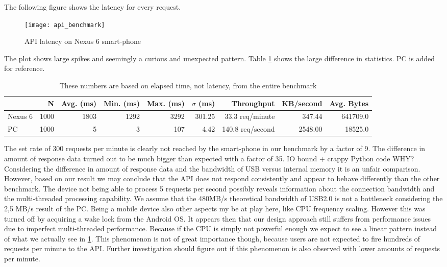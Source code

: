 The following figure shows the latency for every request.
\begin{figure}[h]
	\centering
	\texttt{[image: api\_benchmark]}
	\caption{API latency on Nexus 6 smart-phone}
	\label{fig:api_benchmark}
\end{figure}
The plot shows large spikes and seemingly a curious and unexpected pattern.
Table \ref{table:api_benchmark} shows the large difference in statistics.
PC is added for reference.
\begin{table}
  \begin{tabular}{l | *{8}{r}} \hline
  	 & N & Avg. (ms) & Min. (ms) & Max. (ms) & $\sigma$ (ms) & Throughput & KB/second & Avg. Bytes \\ \hline \hline
	Nexus 6 & 1000 & 1803 & 1292 & 3292 & 301.25 & 33.3 req/minute & 347.44 & 641709.0 \\ \hline
	PC         & 1000 & 5        & 3      & 107   & 4.42     & 140.8 req/second & 2548.00 & 18525.0 \\ \hline
  \end{tabular}
  \caption{These numbers are based on elapsed time, not latency, from the entire benchmark}
  \label{table:api_benchmark}
\end{table}
The set rate of 300 requests per minute is clearly not reached by the smart-phone in our benchmark by a factor of 9.
The difference in amount of response data turned out to be much bigger than expected with a factor of 35.
IO bound + crappy Python code WHY?
Considering the difference in amount of response data and the bandwidth of USB versus internal memory it is an unfair comparison.
However, based on our result we may conclude that the API does not respond consistently and appear to behave differently than the other benchmark.
The device not being able to process 5 requests per second possibly reveals information about the connection bandwidth and the multi-threaded processing capability.
We assume that the 480MB/s theoretical bandwidth of USB2.0 is not a bottleneck considering the 2,5 MB/s result of the PC.
Being a mobile device also other aspects my be at play here, like CPU frequency scaling.
However this was turned off by acquiring a wake lock from the Android OS.
It appears then that our design approach still suffers from performance issues due to imperfect multi-threaded performance.
Because if the CPU is simply not powerful enough we expect to see a linear pattern instead of what we actually see in \ref{fig:api_benchmark}.
This phenomenon is not of great importance though, because users are not expected to fire hundreds of requests per minute to the API.
Further investigation should figure out if this phenomenon is also observed with lower amounts of requests per minute.


